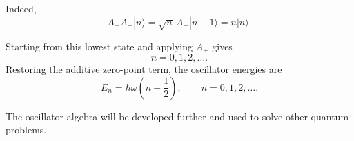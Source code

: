 Indeed,
\begin{equation}
A_+A_-|n\rangle
=\sqrt n\,A_+|n-1\rangle
=n|n\rangle.
\end{equation}

\begin{classroomqa}
\end{classroomqa}


Starting from this lowest state and applying \(A_+\) gives
\begin{equation}
n=0,1,2,\ldots.
\end{equation}
Restoring the additive zero-point term, the oscillator energies are
\begin{equation}
E_n=\hbar\omega\left(n+\frac{1}{2}\right),
\qquad n=0,1,2,\ldots.
\end{equation}

The oscillator algebra will be developed further and used to solve other quantum problems.
